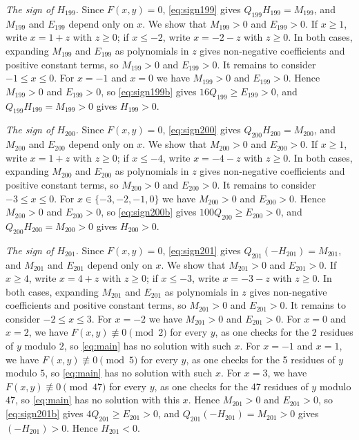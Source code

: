 \documentclass[11pt]{article}
\begin{document}
\emph{The sign of $H_{199}$.} Since $F(x,y)=0$, \eqref{eq:sign199} gives $Q_{199}H_{199}=M_{199}$, and $M_{199}$ and $E_{199}$ depend only on $x$. We show that $M_{199}>0$ and $E_{199}>0$. If $x\geq1$, write $x=1+z$ with $z\geq0$; if $x\leq-2$, write $x=-2-z$ with $z\geq0$. In both cases, expanding $M_{199}$ and $E_{199}$ as polynomials in $z$ gives non-negative coefficients and positive constant terms, so $M_{199}>0$ and $E_{199}>0$. It remains to consider $-1\leq x\leq0$. For $x=-1$ and $x=0$ we have $M_{199}>0$ and $E_{199}>0$. Hence $M_{199}>0$ and $E_{199}>0$, so \eqref{eq:sign199b} gives $16Q_{199}\geq E_{199}>0$, and $Q_{199}H_{199}=M_{199}>0$ gives $H_{199}>0$.

\emph{The sign of $H_{200}$.} Since $F(x,y)=0$, \eqref{eq:sign200} gives $Q_{200}H_{200}=M_{200}$, and $M_{200}$ and $E_{200}$ depend only on $x$. We show that $M_{200}>0$ and $E_{200}>0$. If $x\geq1$, write $x=1+z$ with $z\geq0$; if $x\leq-4$, write $x=-4-z$ with $z\geq0$. In both cases, expanding $M_{200}$ and $E_{200}$ as polynomials in $z$ gives non-negative coefficients and positive constant terms, so $M_{200}>0$ and $E_{200}>0$. It remains to consider $-3\leq x\leq0$. For $x\in\{-3,\allowbreak -2,\allowbreak -1,\allowbreak 0\}$ we have $M_{200}>0$ and $E_{200}>0$. Hence $M_{200}>0$ and $E_{200}>0$, so \eqref{eq:sign200b} gives $100Q_{200}\geq E_{200}>0$, and $Q_{200}H_{200}=M_{200}>0$ gives $H_{200}>0$.

\emph{The sign of $H_{201}$.} Since $F(x,y)=0$, \eqref{eq:sign201} gives $Q_{201}(-H_{201})=M_{201}$, and $M_{201}$ and $E_{201}$ depend only on $x$. We show that $M_{201}>0$ and $E_{201}>0$. If $x\geq4$, write $x=4+z$ with $z\geq0$; if $x\leq-3$, write $x=-3-z$ with $z\geq0$. In both cases, expanding $M_{201}$ and $E_{201}$ as polynomials in $z$ gives non-negative coefficients and positive constant terms, so $M_{201}>0$ and $E_{201}>0$. It remains to consider $-2\leq x\leq3$. For $x=-2$ we have $M_{201}>0$ and $E_{201}>0$. For $x=0$ and $x=2$, we have $F(x,y)\not\equiv0\pmod{2}$ for every $y$, as one checks for the 2 residues of $y$ modulo $2$, so \eqref{eq:main} has no solution with such $x$. For $x=-1$ and $x=1$, we have $F(x,y)\not\equiv0\pmod{5}$ for every $y$, as one checks for the 5 residues of $y$ modulo $5$, so \eqref{eq:main} has no solution with such $x$. For $x=3$, we have $F(x,y)\not\equiv0\pmod{47}$ for every $y$, as one checks for the 47 residues of $y$ modulo $47$, so \eqref{eq:main} has no solution with this $x$. Hence $M_{201}>0$ and $E_{201}>0$, so \eqref{eq:sign201b} gives $4Q_{201}\geq E_{201}>0$, and $Q_{201}(-H_{201})=M_{201}>0$ gives $(-H_{201})>0$. Hence $H_{201}<0$.
\end{document}
